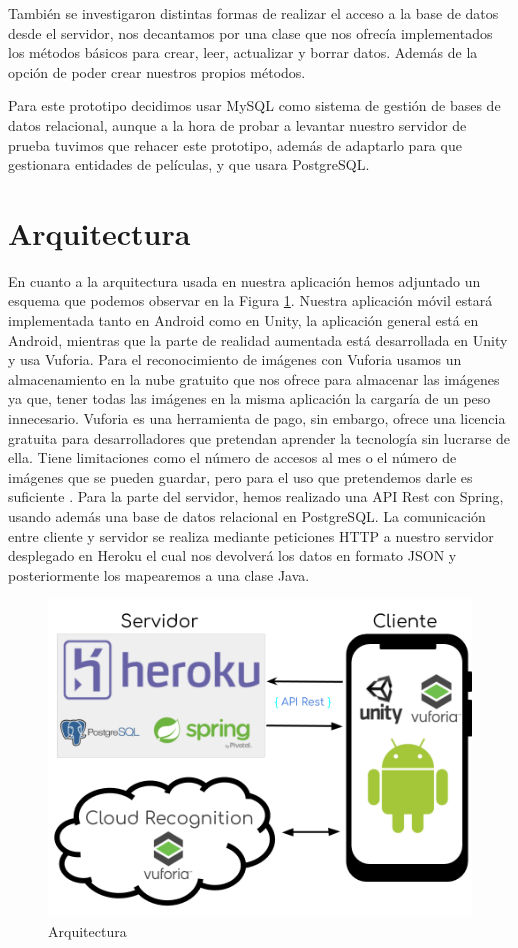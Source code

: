 También se investigaron distintas formas de realizar el acceso a la base de datos desde el servidor, nos decantamos por una clase que nos ofrecía implementados los métodos básicos para crear, leer, actualizar y borrar datos. Además de la opción 
de poder crear nuestros propios métodos.

Para este prototipo decidimos usar MySQL como sistema de gestión de bases de datos relacional, aunque
a la hora de probar a levantar nuestro servidor de prueba tuvimos que rehacer este prototipo, además de adaptarlo para 
que gestionara entidades de películas, y que usara PostgreSQL.
\section{Arquitectura}
\label{makereference4.2}
En cuanto a la arquitectura usada en nuestra aplicación hemos adjuntado un esquema que podemos observar en la Figura \ref{fig:arquitectura}. Nuestra aplicación móvil estará implementada tanto en Android
como en Unity, la aplicación general está en Android, mientras que la parte de realidad aumentada está desarrollada en Unity y usa Vuforia. Para el reconocimiento
de imágenes con Vuforia usamos un almacenamiento en la nube gratuito que nos ofrece para almacenar las imágenes ya que, tener todas las imágenes en la misma aplicación la cargaría de un peso innecesario. Vuforia es una herramienta de pago, sin embargo, 
ofrece una licencia gratuita para desarrolladores que pretendan aprender la tecnología sin lucrarse de ella\cite{vuforia_prices}. Tiene limitaciones como el número de accesos al mes o el número de imágenes que se pueden guardar, pero para el uso que pretendemos 
darle es suficiente \cite{vuforia_free}. 
Para la parte del servidor, hemos realizado una API Rest con Spring, usando además una base de datos relacional en PostgreSQL. La comunicación entre cliente y servidor se realiza mediante peticiones HTTP a 
nuestro servidor desplegado en Heroku el cual nos devolverá los datos en formato JSON y posteriormente los mapearemos a una clase Java.
\begin{figure}[H]
    \centering
    \includegraphics[width=6in]{figures/chapter-4/arquitectura.png}
    \caption{Arquitectura}
    \label{fig:arquitectura}
\end{figure}
